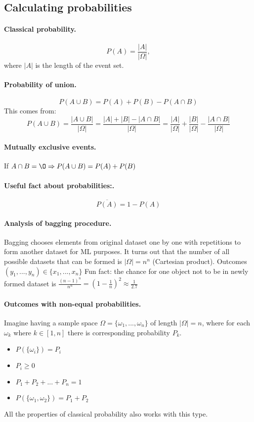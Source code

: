 \documentclass{article}
\begin{document}
\subsection{Calculating probabilities}

\paragraph{Classical probability.}
\[
P(A) = \frac{|A|}{|\Omega|},
\]
where $|A|$ is the length of the event set.

\paragraph{Probability of union.}
\[
P(A \cup B) = P(A) + P(B) - P(A \cap B)
\]
This comes from:
\[
P(A \cup B) = \frac{|A \cup B|}{|\Omega|} = \frac{|A| + |B| - |A \cap B|}{|\Omega|} = \frac{|A|}{|\Omega|} + \frac{|B|}{|\Omega|} - \frac{|A \cap B|}{|\Omega|} 
\]

\paragraph{Mutually exclusive events.}
If $A \cap B = \O \Rightarrow P(A \cup B) = P(A) + P(B)$ 
\paragraph{Useful fact about probabilities:.}
\[
\overline{P(A)} = 1 - P(A)
\]

\paragraph{Analysis of bagging procedure.}
Bagging chooses elements from original dataset one by one with repetitions to form another dataset for ML purposes. It turns out that the number of all possible datasets that can be formed is $|\Omega| = n^n$ (Cartesian product). Outcomes $(y_1, ..., y_n) \in \{x_1, ..., x_n\}$ Fun fact: the chance for one object not to be in newly formed dataset is $\frac{(n-1)^n}{n^n} = (1-\frac{1}{n})^2 \approx \frac{1}{2.7}$

\paragraph{Outcomes with non-equal probabilities.}
Imagine having a sample space $\Omega=\{\omega_1, ..., \omega_n\}$ of length $|\Omega| = n$, where for each $\omega_k$ where $k \in [1,n]$ there is corresponding probability $P_k$.
\begin{itemize}
  \item $P(\{\omega_i\}) = P_i$
  \item $P_i \geq 0$
  \item $P_1 + P_2 + ... + P_n = 1$
  \item $P(\{\omega_1,\omega_2\}) = P_1 + P_2$
\end{itemize}
All the properties of classical probability also works with this type.
\end{document}
